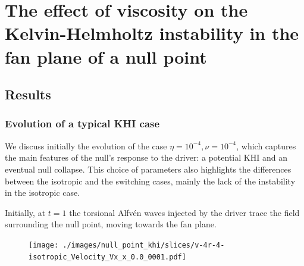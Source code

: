 \chapter{The effect of viscosity on the Kelvin-Helmholtz instability in the fan plane of a null point}

\section{Results}

\subsection{Evolution of a typical KHI case}

We discuss initially the evolution of the case $\eta = 10^{-4}, \nu = 10^{-4}$, which captures the main features of the null's response to the driver: a potential KHI and an eventual null collapse. This choice of parameters also highlights the differences between the isotropic and the switching cases, mainly the lack of the instability in the isotropic case.

Initially, at $t=1$ the torsional Alfv\'en waves injected by the driver trace the field surrounding the null point, moving towards the fan plane.

\begin{figure}[H]
  \centering
  \texttt{[image: ./images/null\_point\_khi/slices/v-4r-4-isotropic\_Velocity\_Vx\_x\_0.0\_0001.pdf]}
\end{figure}





